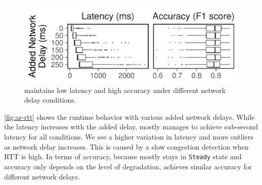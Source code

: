 \begin{figure}
  \centering
  \includegraphics[width=.9\columnwidth]{figures/runtime_darknet-bench.pdf}
  \caption{\sysname{} maintains low latency and high accuracy under different
    network delay conditions.}
  \label{fig:ar-rtt}
\end{figure}

\autoref{fig:ar-rtt} shows the runtime behavior with various added network
delays. While the latency increases with the added delay, \sysname{} mostly
manages to achieve sub-second latency for all conditions. We see a higher
variation in latency and more outliers as network delay increases. This is
caused by a slow congestion detection when RTT is high. In terms of accuracy,
because \sysname{} mostly stays in \texttt{Steady} state and accuracy only
depends on the level of degradation, \sysname{} achieves similar accuracy for
different network delays.

